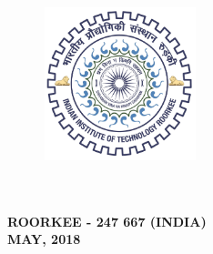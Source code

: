 \begin{titlepage}
\begin{center}
\vspace{0.5cm}
\begin{figure}[h]
  \centering
  \includegraphics[width=1.75in, height=1.75in]{formalities/logo.jpg}
\end{figure}
\renewcommand{\baselinestretch}{1.2}
\vspace{1.0cm}
\begingroup
    \fontsize{14pt}{12pt} \selectfont
    \bfseries
\deptname\\
\univname\\
ROORKEE - 247 667 (INDIA)\\
MAY, 2018  
\endgroup
\end{center}

\end{titlepage}